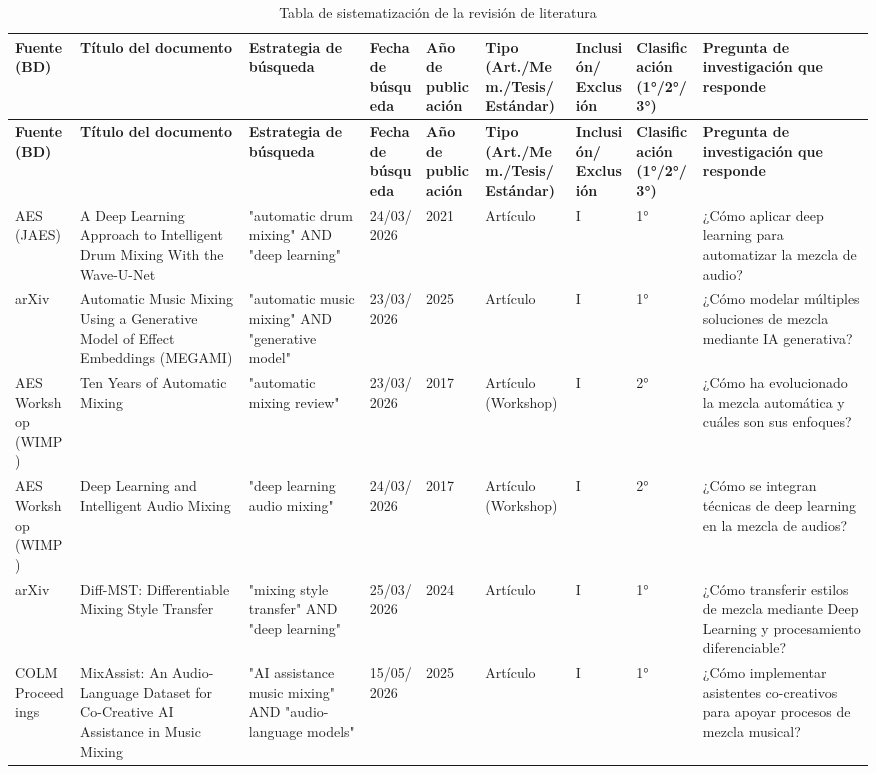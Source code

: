 \documentclass[12pt]{article}
\begin{document}
\begin{longtable}{|p{1.4cm}|p{3.0cm}|p{2.2cm}|p{1.5cm}|p{1.0cm}|p{1.6cm}|p{0.9cm}|p{1.3cm}|p{2.6cm}|}
\caption{Tabla de sistematización de la revisión de literatura}
\label{tab:sistematizacion} \\
\hline
\textbf{Fuente (BD)} & \textbf{Título del documento} & \textbf{Estrategia de búsqueda} & \textbf{Fecha de búsqueda} & \textbf{Año de publicación} & \textbf{Tipo (Art./Mem./Tesis/Estándar)} & \textbf{Inclusión/ Exclusión} & \textbf{Clasificación (1°/2°/3°)} & \textbf{Pregunta de investigación que responde} \\
\hline
\endfirsthead
\hline
\textbf{Fuente (BD)} & \textbf{Título del documento} & \textbf{Estrategia de búsqueda} & \textbf{Fecha de búsqueda} & \textbf{Año de publicación} & \textbf{Tipo (Art./Mem./Tesis/Estándar)} & \textbf{Inclusión/ Exclusión} & \textbf{Clasificación (1°/2°/3°)} & \textbf{Pregunta de investigación que responde} \\
\hline
\endhead
\hline
\endfoot
AES (JAES) & A Deep Learning Approach to Intelligent Drum Mixing With the Wave-U-Net & "automatic drum mixing" AND "deep learning" & 24/03/2026 & 2021 & Artículo & I & 1° & ¿Cómo aplicar deep learning para automatizar la mezcla de audio? \\
\hline
arXiv & Automatic Music Mixing Using a Generative Model of Effect Embeddings (MEGAMI) & "automatic music mixing" AND "generative model" & 23/03/2026 & 2025 & Artículo & I & 1° & ¿Cómo modelar múltiples soluciones de mezcla mediante IA generativa? \\
\hline
AES Workshop (WIMP) & Ten Years of Automatic Mixing & "automatic mixing review" & 23/03/2026 & 2017 & Artículo (Workshop) & I & 2° & ¿Cómo ha evolucionado la mezcla automática y cuáles son sus enfoques? \\
\hline
AES Workshop (WIMP) & Deep Learning and Intelligent Audio Mixing & "deep learning audio mixing" & 24/03/2026 & 2017 & Artículo (Workshop) & I & 2° & ¿Cómo se integran técnicas de deep learning en la mezcla de audios? \\
\hline
arXiv & Diff-MST: Differentiable Mixing Style Transfer & "mixing style transfer" AND "deep learning" & 25/03/2026 & 2024 & Artículo & I & 1° & ¿Cómo transferir estilos de mezcla mediante Deep Learning y procesamiento diferenciable? \\
\hline
COLM Proceedings & MixAssist: An Audio-Language Dataset for Co-Creative AI Assistance in Music Mixing & "AI assistance music mixing" AND "audio-language models" & 15/05/2026 & 2025 & Artículo & I & 1° & ¿Cómo implementar asistentes co-creativos para apoyar procesos de mezcla musical? \\

\end{longtable}
\end{document}
